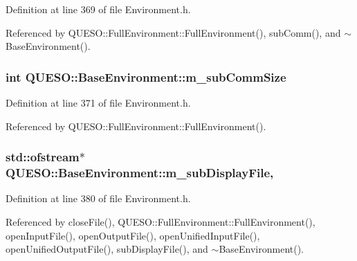 Definition at line 369 of file Environment.\-h.



Referenced by Q\-U\-E\-S\-O\-::\-Full\-Environment\-::\-Full\-Environment(), sub\-Comm(), and $\sim$\-Base\-Environment().

\hypertarget{class_q_u_e_s_o_1_1_base_environment_a4c7b8104e4bb3f1456aa2d85b4dc9a03}{
\subsubsection[{m\-\_\-sub\-Comm\-Size}]{\setlength{\rightskip}{0pt plus 5cm}int Q\-U\-E\-S\-O\-::\-Base\-Environment\-::m\-\_\-sub\-Comm\-Size\hspace{0.3cm}{\ttfamily [protected]}}}\label{class_q_u_e_s_o_1_1_base_environment_a4c7b8104e4bb3f1456aa2d85b4dc9a03}


Definition at line 371 of file Environment.\-h.



Referenced by Q\-U\-E\-S\-O\-::\-Full\-Environment\-::\-Full\-Environment().

\hypertarget{class_q_u_e_s_o_1_1_base_environment_a52b4275aa8ee85994dd304d9fe95c9c5}{
\subsubsection[{m\-\_\-sub\-Display\-File}]{\setlength{\rightskip}{0pt plus 5cm}std\-::ofstream$\ast$ Q\-U\-E\-S\-O\-::\-Base\-Environment\-::m\-\_\-sub\-Display\-File\hspace{0.3cm}{\ttfamily [mutable]}, {\ttfamily [protected]}}}\label{class_q_u_e_s_o_1_1_base_environment_a52b4275aa8ee85994dd304d9fe95c9c5}


Definition at line 380 of file Environment.\-h.



Referenced by close\-File(), Q\-U\-E\-S\-O\-::\-Full\-Environment\-::\-Full\-Environment(), open\-Input\-File(), open\-Output\-File(), open\-Unified\-Input\-File(), open\-Unified\-Output\-File(), sub\-Display\-File(), and $\sim$\-Base\-Environment().

